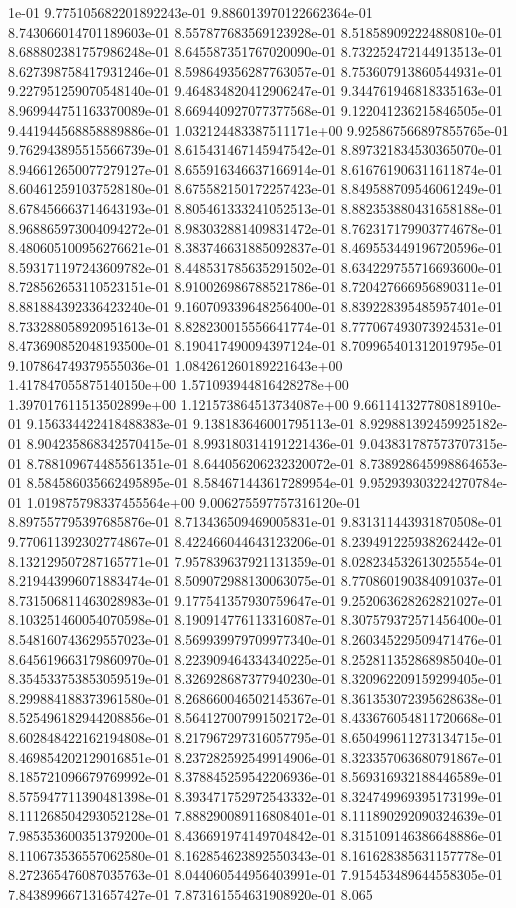 1e-01	9.775105682201892243e-01	9.886013970122662364e-01	8.743066014701189603e-01	8.557877683569123928e-01	8.518589092224880810e-01	8.688802381757986248e-01	8.645587351767020090e-01	8.732252472144913513e-01	8.627398758417931246e-01	8.598649356287763057e-01	8.753607913860544931e-01	9.227951259070548140e-01	9.464834820412906247e-01	9.344761946818335163e-01	8.969944751163370089e-01	8.669440927077377568e-01	9.122041236215846505e-01	9.441944568858889886e-01	1.032124483387511171e+00	9.925867566897855765e-01	9.762943895515566739e-01	8.615431467145947542e-01	8.897321834530365070e-01	8.946612650077279127e-01	8.655916346637166914e-01	8.616761906311611874e-01	8.604612591037528180e-01	8.675582150172257423e-01	8.849588709546061249e-01	8.678456663714643193e-01	8.805461333241052513e-01	8.882353880431658188e-01	8.968865973004094272e-01	8.983032881409831472e-01	8.762317179903774678e-01	8.480605100956276621e-01	8.383746631885092837e-01	8.469553449196720596e-01	8.593171197243609782e-01	8.448531785635291502e-01	8.634229755716693600e-01	8.728562653110523151e-01	8.910026986788521786e-01	8.720427666956890311e-01	8.881884392336423240e-01	9.160709339648256400e-01	8.839228395485957401e-01	8.733288058920951613e-01	8.828230015556641774e-01	8.777067493073924531e-01	8.473690852048193500e-01	8.190417490094397124e-01	8.709965401312019795e-01	9.107864749379555036e-01	1.084261260189221643e+00	1.417847055875140150e+00	1.571093944816428278e+00	1.397017611513502899e+00	1.121573864513734087e+00	9.661141327780818910e-01	9.156334422418488383e-01	9.138183646001795113e-01	8.929881392459925182e-01	8.904235868342570415e-01	8.993180314191221436e-01	9.043831787573707315e-01	8.788109674485561351e-01	8.644056206232320072e-01	8.738928645998864653e-01	8.584586035662495895e-01	8.584671443617289954e-01	9.952939303224270784e-01	1.019875798337455564e+00	9.006275597757316120e-01	8.897557795397685876e-01	8.713436509469005831e-01	9.831311443931870508e-01	9.770611392302774867e-01	8.422466044643123206e-01	8.239491225938262442e-01	8.132129507287165771e-01	7.957839637921131359e-01	8.028234532613025554e-01	8.219443996071883474e-01	8.509072988130063075e-01	8.770860190384091037e-01	8.731506811463028983e-01	9.177541357930759647e-01	9.252063628262821027e-01	8.103251460054070598e-01	8.190914776113316087e-01	8.307579372571456400e-01	8.548160743629557023e-01	8.569939979709977340e-01	8.260345229509471476e-01	8.645619663179860970e-01	8.223909464334340225e-01	8.252811352868985040e-01	8.354533753853059519e-01	8.326928687377940230e-01	8.320962209159299405e-01	8.299884188373961580e-01	8.268660046502145367e-01	8.361353072395628638e-01	8.525496182944208856e-01	8.564127007991502172e-01	8.433676054811720668e-01	8.602848422162194808e-01	8.217967297316057795e-01	8.650499611273134715e-01	8.469854202129016851e-01	8.237282592549914906e-01	8.323357063680791867e-01	8.185721096679769992e-01	8.378845259542206936e-01	8.569316932188446589e-01	8.575947711390481398e-01	8.393471752972543332e-01	8.324749969395173199e-01	8.111268504293052128e-01	7.888290089116808401e-01	8.111890292090324639e-01	7.985353600351379200e-01	8.436691974149704842e-01	8.315109146386648886e-01	8.110673536557062580e-01	8.162854623892550343e-01	8.161628385631157778e-01	8.272365476087035763e-01	8.044060544956403991e-01	7.915453489644558305e-01	7.843899667131657427e-01	7.873161554631908920e-01	8.065